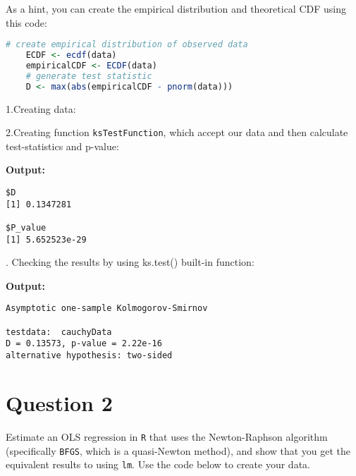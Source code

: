 \documentclass[12pt,letterpaper]{article}
\begin{document}
	
\noindent As a hint, you can create the empirical distribution and theoretical CDF using this code:

\begin{lstlisting}[language=R]
	# create empirical distribution of observed data
	ECDF <- ecdf(data)
	empiricalCDF <- ECDF(data)
	# generate test statistic
	D <- max(abs(empiricalCDF - pnorm(data))) 
	\end{lstlisting}

\vspace{.5cm}
\noindent 1.Creating data:
 

\vspace{.5cm}
\noindent 2.Creating function \texttt{ksTestFunction}, which accept our data and then calculate test-statistics and p-value:
 


\vspace{.5cm}
\noindent \textbf{Output: }
\begin{lstlisting}
$D
[1] 0.1347281

$P_value
[1] 5.652523e-29
\end{lstlisting}

\vspace{.5cm}
. Checking the results by using ks.test() built-in function:
 

\vspace{.5cm}
\noindent \textbf{Output: }
\begin{lstlisting}
Asymptotic one-sample Kolmogorov-Smirnov 

testdata:  cauchyData
D = 0.13573, p-value = 2.22e-16
alternative hypothesis: two-sided
\end{lstlisting}

\pagebreak

\section*{Question 2}
\noindent Estimate an OLS regression in \texttt{R} that uses the Newton-Raphson algorithm (specifically \texttt{BFGS}, which is a quasi-Newton method), and show that you get the equivalent results to using \texttt{lm}. Use the code below to create your data.
\vspace{.5cm}
 
\end{document}
